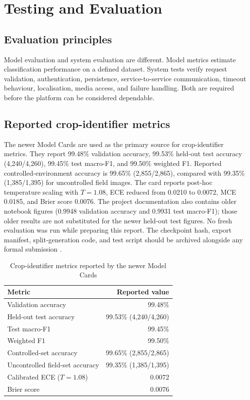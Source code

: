 \documentclass[12pt,a4paper,oneside,openany]{report}
\begin{document}
\chapter{Testing and Evaluation}
\section{Evaluation principles}
Model evaluation and system evaluation are different. Model metrics estimate classification performance on a defined dataset. System tests verify request validation, authentication, persistence, service-to-service communication, timeout behaviour, localisation, media access, and failure handling. Both are required before the platform can be considered dependable.

\section{Reported crop-identifier metrics}
The newer Model Cards are used as the primary source for crop-identifier metrics. They report 99.48\% validation accuracy, 99.53\% held-out test accuracy (4,240/4,260), 99.45\% test macro-F1, and 99.50\% weighted F1. Reported controlled-environment accuracy is 99.65\% (2,855/2,865), compared with 99.35\% (1,385/1,395) for uncontrolled field images. The card reports post-hoc temperature scaling with $T=1.08$, ECE reduced from 0.0210 to 0.0072, MCE 0.0185, and Brier score 0.0076. The project documentation also contains older notebook figures (0.9948 validation accuracy and 0.9931 test macro-F1); those older results are not substituted for the newer held-out test figures. No fresh evaluation was run while preparing this report. The checkpoint hash, export manifest, split-generation code, and test script should be archived alongside any formal submission \cite{model_cards}.

\begin{table}[htbp]
\centering
\caption{Crop-identifier metrics reported by the newer Model Cards}
\begin{tabular}{P{4.0cm}r}
\toprule
\textbf{Metric} & \textbf{Reported value}\\
\midrule
Validation accuracy & 99.48\%\\
Held-out test accuracy & 99.53\% (4,240/4,260)\\
Test macro-F1 & 99.45\%\\
Weighted F1 & 99.50\%\\
Controlled-set accuracy & 99.65\% (2,855/2,865)\\
Uncontrolled field-set accuracy & 99.35\% (1,385/1,395)\\
Calibrated ECE ($T=1.08$) & 0.0072\\
Brier score & 0.0076\\
\bottomrule
\end{tabular}
\end{table}
\end{document}
